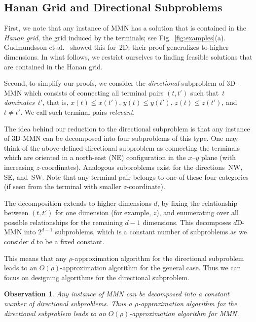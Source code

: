 \documentclass[11pt]{llncs}
\newcommand{\etal}{et al.}
\newtheorem{observation}{Observation}
\begin{document}
\subsection{Hanan Grid and Directional Subproblems}
\label{sec:hann-grid-direct}

First, we note that any instance of MMN has a solution that is
contained in the \emph{Hanan grid}, the grid induced by the terminals;
see Fig.~\ref{fig:examples}(a).  Gudmundsson \etal~\cite{gln-ammn-01}
showed this for~2D; their proof generalizes to higher dimensions.  In
what follows, we restrict ourselves to finding feasible solutions
that are contained in the Hanan grid.

Second, to simplify our proofs, we consider the \emph{directional}
subproblem of 3D-MMN which consists of connecting all terminal
pairs $(t,t')$ such that~$t$ \emph{dominates}~$t'$, that is, $x(t) \le
x(t')$, $y(t) \le y(t')$, $z(t) \le z(t')$, and $t \ne t'$.  We call such
terminal pairs \emph{relevant}.  

The idea behind our reduction to the directional subproblem is that
any instance of 3D-MMN can be decomposed into four subproblems of this
type.  One may think of the above-defined directional subproblem as
connecting the terminals which are oriented in a north-east (NE)
configuration in the $x$--$y$ plane (with increasing
$z$-coor\-di\-nates).  Analogous subproblems exist for the
directions~NW, SE, and~SW.  Note that any terminal pair belongs to one
of these four categories (if seen from the terminal with smaller
$z$-coordinate).

The decomposition extends to higher dimensions $d$, by fixing the
relationship between $(t,t')$ for one dimension (for example, $z$), and
enumerating over all possible relationships for the remaining $d-1$
dimensions. This decomposes $d$D-MMN into $2^{d-1}$ 
subproblems, which is a constant number of subproblems as we consider
$d$ to be a fixed constant.  

This means that any
$\rho$-approximation algorithm for the directional subproblem leads to
an $O(\rho)$-approxi\-mation algorithm for the general case.
Thus we can focus on designing algorithms for the directional subproblem.  

\begin{observation} 
  \label{obs:dir-sub} 
  Any instance of MMN can be decomposed into a constant number of
  directional subproblems.  Thus a $\rho$-approximation algorithm for
  the directional subproblem leads to an $O(\rho)$-approximation
  algorithm for MMN.
\end{observation}
     
\end{document}
